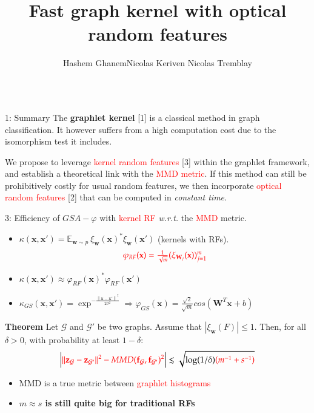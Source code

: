 \documentclass[final,dvipsnames]{beamer}
\title{Fast graph kernel with optical random features}
\author{ \qquad Hashem Ghanem\qquad Nicolas Keriven \qquad Nicolas Tremblay}
\institute{GIPSA-lab, CNRS, UGA, Grenoble INP, France
}
\newcommand{\vsp}{\vspace{10pt}}
\newcommand{\myemph}[1]{\textcolor{red}{#1}}
\newcommand{\mycolbacksum}[1]{
\hspace*{.01\linewidth}\begin{minipage}{.96\linewidth}
\begin{mdframed}[backgroundcolor=blue!10,linewidth=0pt]
\vsp
#1
\end{mdframed}
\end{minipage}
}
\newcommand{\mycolback}[1]{
\hspace*{.01\linewidth}\begin{minipage}{.96\linewidth}
\begin{mdframed}[backgroundcolor=blue!10,linewidth=0pt]
\vsp
#1
\vsp
\end{mdframed}
\end{minipage}
}
\begin{document}
\begin{frame}{}
\vspace{-40pt}
\begin{columns}[t]
\begin{column}{0.25\linewidth}
\begin{myalertblock}{1: Summary}
	The \textbf{graphlet kernel} [1] is a classical method in graph classification. It however suffers from a high computation cost due to the isomorphism test it includes.
\begin{center}	
\mycolbacksum{We propose to leverage \myemph{kernel random features} [3] within the graphlet framework, and establish a theoretical link with the \myemph{MMD metric}. If this method can still be prohibitively costly for usual random features, we then incorporate \myemph{optical random features} [2] that can be computed in \emph{constant time}.}
\end{center}

\end{myalertblock}
\vsp 


\begin{myalertblock}{3: Efficiency of $GSA-\varphi$ with \myemph{kernel RF} \emph{w.r.t.} the \myemph{MMD} metric.}
\vspace{0.3cm}
\small 
\begin{itemize}
	\item $\kappa(\mathbf{x},\mathbf{x}')= \mathbb{E}_{\mathbf{w} \sim p}~ \xi_\mathbf{w}(\mathbf{x})^* \xi_\mathbf{w}(\mathbf{x}')$ (kernels with RFs).
	\vsp
	\begin{equation*}
		\textcolor{red}{\varphi_{RF}(\mathbf{x}) = \tfrac{1}{\sqrt{m}} ( \xi_{\mathbf{W}_j}(\mathbf{x}) )_{j=1}^m}
	\end{equation*}
	\item $\kappa(\mathbf{x},\mathbf{x}')\approx \varphi_{RF}(\mathbf{x})^*\varphi_{RF}(\mathbf{x}')$
	\vsp 
	\item  $\kappa_{GS}(\mathbf{x},\mathbf{x}')=\exp^{-\frac{\left \| \mathbf{x}-\mathbf{x}'\right\|^2}{2\sigma^2}} \Rightarrow \varphi_{GS}(\mathbf{x}) = \frac{\sqrt{2}}{\sqrt{m}} cos( \mathbf{W}^T\mathbf{x}+b )$
\end{itemize}
\vsp
\mycolback{
\textbf{Theorem}
Let $\mathcal{G}$ and $\mathcal{G}'$ be two graphs.  Assume that $|\xi_\mathbf{w}(F)| \leq 1$.
Then, for all $\delta>0$, with probability at least $1-\delta$:
\begin{equation*}
	\Big|\textcolor{red}{\|\mathbf{z}_\mathcal{G} - \mathbf{z}_{\mathcal{G}'}\|^2 - MMD(\mathbf{f}_\mathcal{G},\mathbf{f}_{\mathcal{G}'})^2} \Big| \lesssim
	\sqrt{\log(1/\delta)\textcolor{red}{\left(m^{-1} + s^{-1}\right)}}
\end{equation*}
\vspace{-1cm}
}
\begin{itemize}
	\item MMD is a true metric between \myemph{graphlet histograms}
	\item \textbf{$m\approx s$ is still quite big for traditional RFs}
\end{itemize}
\end{myalertblock}


\end{column}
\end{columns}
\end{frame}
\end{document}
